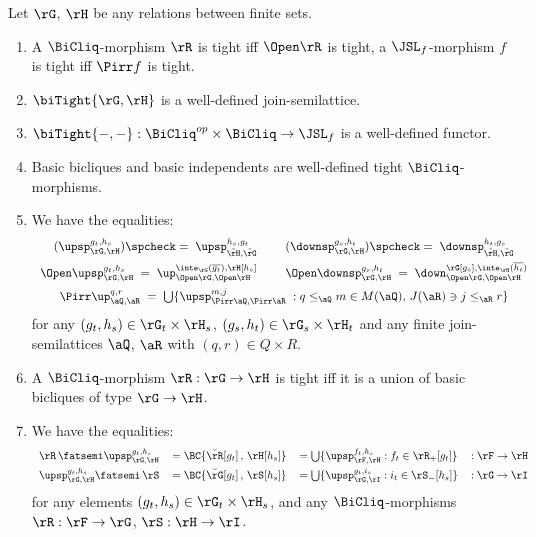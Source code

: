 \documentclass{article}
\begin{document}
\begin{lemma}
\label{lem:bicliq_tight_basic}
\item
Let $\rG$, $\rH$ be any relations between finite sets.
\begin{enumerate}

\item
A $\BiCliq$-morphism $\rR$ is tight iff $\Open\rR$ is tight, a $\JSL_f$-morphism $f$ is tight iff $\Pirr f$ is tight.

\item
$\biTight{\rG,\rH}$ is a well-defined join-semilattice.

\item
$\biTight{-,-} : \BiCliq^{op} \times \BiCliq \to \JSL_f$ is a well-defined functor.

\item
Basic bicliques and basic independents are well-defined tight $\BiCliq$-morphisms.

\item
We have the equalities:
\[
\begin{tabular}{c}
$(\upsp_{\rG,\rH}^{g_t,h_s})\spcheck = \; \upsp_{\breve{\rH},\breve{\rG}}^{h_s,g_t}$
\qquad
$(\downsp_{\rG,\rH}^{g_s,h_t})\spcheck = \; \downsp_{\breve{\rH},\breve{\rG}}^{h_t,g_s}$
\\[1.5ex]
$\Open\upsp_{\rG,\rH}^{g_t,h_s} \; = \;\up_{\Open\rG,\Open\rH}^{\inte_\rG(\overline{g_t}), 
\rH[h_s]}$
\qquad
$\Open\downsp_{\rG,\rH}^{g_s,h_t} \; = \; \down_{\Open\rG,\Open\rH}^{\rG[g_s],\inte_\rH(\overline{h_t})}$
\\[1.5ex]
$\Pirr\up_{\aQ,\aR}^{q,r} \; = \; \bigcup \{ \upsp_{\Pirr\aQ,\Pirr\aR}^{m,j} \; : q \leq_\aQ m \in M(\aQ),\, J(\aR) \ni j \leq_\aR r \}$
\end{tabular}
\]
for any $(g_t,h_s) \in \rG_t \times \rH_s$, $(g_s,h_t) \in \rG_s \times \rH_t$ and any finite join-semilattices $\aQ$, $\aR$ with $(q,r) \in Q \times R$.


\item
A $\BiCliq$-morphism $\rR : \rG \to \rH$ is tight iff it is a union of basic bicliques of type $\rG \to \rH$.

\item
We have the equalities:
\[
\begin{tabular}{llll}
$\rR \, \fatsemi \upsp_{\rG,\rH}^{g_t,h_s}$
&
$= \BC{\breve{\rR}[g_t]\,,\,\rH[h_s]}$
&
$= \bigcup \{ \upsp_{\rF,\rH}^{f_t,h_s} : f_t \in \rR_+[g_t] \}$
&
$: \rF \to \rH$
\\[1ex]
$\upsp_{\rG,\rH}^{g_t,h_s} \fatsemi \, \rS$
&
$= \BC{\breve{\rG}[g_t]\,,\,\rS[h_s]} $
&
$= \bigcup \{ \upsp_{\rG,\rI}^{g_t,i_s} : i_t \in \rS_-[h_s]  \}$
&
$: \rG \to \rI$
\end{tabular}
\]
for any elements $(g_t,h_s) \in \rG_t \times \rH_s$, and any $\BiCliq$-morphisms $\rR : \rF \to \rG$, $\rS : \rH \to \rI$.


\end{enumerate}
\end{lemma}
\end{document}
